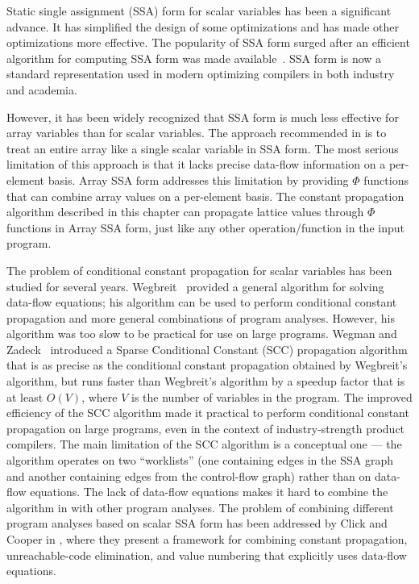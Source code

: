 Static single assignment (SSA) form for scalar variables has been a significant
advance.  It has simplified the design of some optimizations and has made
other optimizations more effective.  
The popularity of SSA form surged
after an efficient algorithm for computing SSA form was made available~\cite{Cytron:1991:TOPLAS}.  SSA form is now a standard representation used in modern
optimizing compilers in both industry and academia.

However, it has been widely recognized that SSA form is much less
effective for array variables than for scalar variables.
The approach recommended in \cite{Cytron:1991:TOPLAS} is to treat an
entire array like a single scalar variable in SSA form.
The most serious limitation of this approach is that it lacks precise
data-flow information on a per-element basis.
Array SSA form addresses this limitation by providing $\Phi$
functions that can combine array values on a per-element basis.
The constant propagation algorithm described in this
chapter can  propagate lattice values through $\Phi$ functions 
in Array SSA form,
just
like any other operation/function in the input program.

The problem of conditional constant propagation for 
scalar variables 
has been
studied for several years.  Wegbreit~\cite{Wegb75} provided a general
algorithm for solving data-flow equations; his algorithm
can be used to perform conditional constant propagation and
more general combinations of program analyses.
However, his algorithm was too slow to be practical for use on 
large programs.
Wegman and Zadeck~\cite{WZ91} introduced a Sparse Conditional
Constant (SCC) propagation algorithm that is as precise as the conditional
constant propagation obtained by Wegbreit's algorithm, but runs faster
than Wegbreit's algorithm by a speedup factor that is at least $O(V)$,
where $V$ is the number of variables in the program.  
The improved efficiency of the SCC algorithm made it practical to
perform conditional constant propagation on large programs, even in the
context of industry-strength product compilers.  The main limitation
of the SCC algorithm is a conceptual one --- the algorithm operates
on two ``worklists''
(one containing edges in the SSA graph and another
containing edges from the control-flow graph)
rather than on data-flow equations.  The lack of
data-flow equations
makes it hard to combine the algorithm in \cite{WZ91}
with other program analyses.
The problem  of combining different program analyses based on
scalar SSA form has been addressed by Click and
Cooper in \cite{ClCo95}, where they present a framework for 
combining constant propagation, unreachable-code elimination,
and value numbering that explicitly uses data-flow equations.

